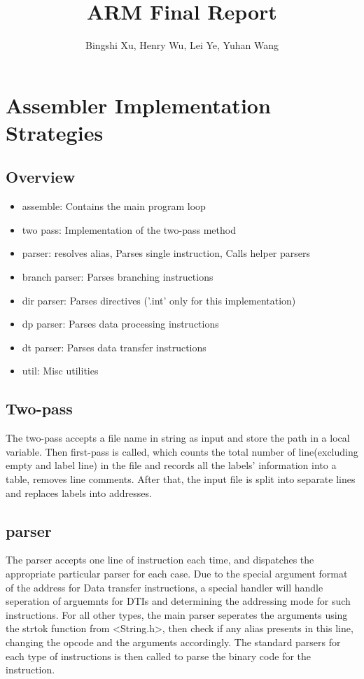\documentclass[11pt]{article}
\begin{document}
\title{ARM Final Report}
\author{Bingshi Xu, Henry Wu, Lei Ye, Yuhan Wang}

\maketitle

\section{Assembler Implementation Strategies}

\subsection{Overview}
\begin{itemize}
    \item assemble: Contains the main program loop
    \item two pass: Implementation of the two-pass method
    \item parser: resolves alias, Parses single instruction, Calls helper parsers
    \item branch parser: Parses branching instructions
    \item dir parser: Parses directives ('.int' only for this implementation)
    \item dp parser: Parses data processing instructions
    \item dt parser: Parses data transfer instructions
    \item util: Misc utilities
\end{itemize}

\subsection{Two-pass}
The two-pass accepts a file name in string as input and store the path in a local variable. 
Then first-pass is called, which counts the total number of line(excluding empty and label line) 
in the file and records all the labels' information into a table, removes line comments. After that, the input file is split
into separate lines and replaces labels into addresses.

\subsection{parser}
The parser accepts one line of instruction each time, and dispatches the appropriate particular parser for each case.
Due to the special argument format of the address for Data transfer instructions, a special handler will handle seperation of arguemnts for DTIs and determining the 
addressing mode for such instructions. For all other types, the main parser seperates the arguments using the strtok function from <String.h>, then check if any alias presents in 
this line, changing the opcode and the arguments accordingly. The standard parsers for each type of instructions is then called to parse the binary code for the instruction.
\end{document}
